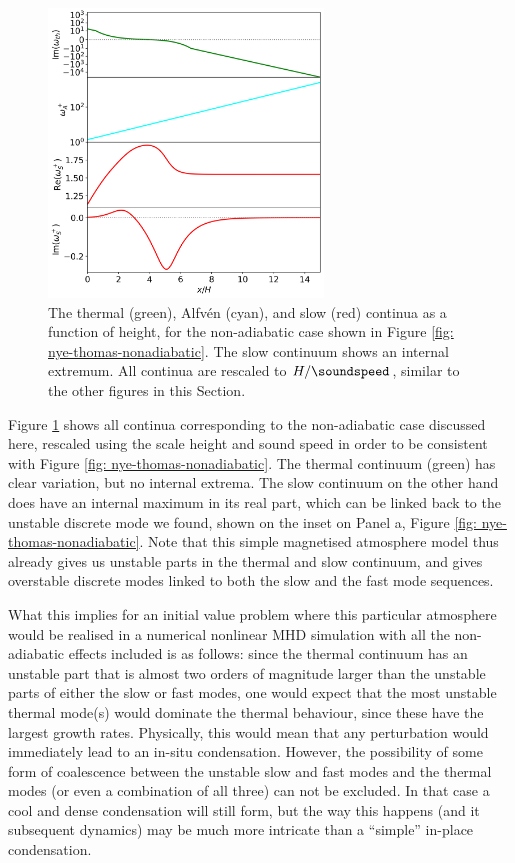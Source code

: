\begin{figure}[t]
  \centering
  \includegraphics[width=0.65\textwidth]{nye_thomas_continua.png}
  \caption{
    The thermal (green), Alfv\'en (cyan), and slow (red) continua as a function of height, for the non-adiabatic case shown in Figure \ref{fig: nye-thomas-nonadiabatic}. The slow continuum shows an internal extremum. All continua are rescaled to $H / \soundspeed$, similar to the other figures in this Section.
  }
  \label{fig: nye-thomas-continua}
\end{figure}

Figure \ref{fig: nye-thomas-continua} shows all continua corresponding to the non-adiabatic case discussed here, rescaled using the scale height and sound speed in order to be consistent with Figure \ref{fig: nye-thomas-nonadiabatic}. The thermal continuum (green) has clear variation, but no internal extrema. The slow continuum on the other hand does have an internal maximum in its real part, which can be linked back to the unstable discrete mode we found, shown on the inset on Panel a, Figure \ref{fig: nye-thomas-nonadiabatic}. Note that this simple magnetised atmosphere model thus already gives us unstable parts in the thermal and slow continuum, and gives overstable discrete modes linked to both the slow and the fast mode sequences.

What this implies for an initial value problem where this particular atmosphere would be realised in a numerical nonlinear MHD simulation with all the non-adiabatic effects included is as follows: since the thermal continuum has an unstable part that is almost two orders of magnitude larger than the unstable parts of either the slow or fast modes, one would expect that the most unstable thermal mode(s) would dominate the thermal behaviour, since these have the largest growth rates. Physically, this would mean that any perturbation would immediately lead to an in-situ condensation. However, the possibility of some form of coalescence between the unstable slow and fast modes and the thermal modes (or even a combination of all three) can not be excluded. In that case a cool and dense condensation will still form, but the way this happens (and it subsequent dynamics) may be much more intricate than a ``simple'' in-place condensation.


